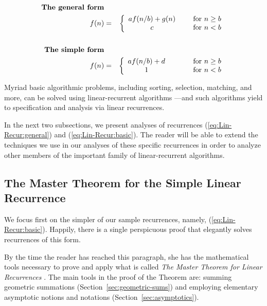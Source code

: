 \newpage

\begin{eqnarray}
\nonumber
\mbox{\bf The general form} & & \\
\label{eq:Lin-Recur:general}
f(n) & = & \left\{
\begin{array}{cl}
a f(n/b) + g(n) & \hspace*{.2in} \mbox{for } n \geq b \\
c & \hspace*{.2in} \mbox{for } n < b
\end{array}
\right. \\
\nonumber
  & & \\
\nonumber
\mbox{\bf The simple form} & & \\
\label{eq:Lin-Recur:basic}
f(n) & = & \left\{
\begin{array}{cl}
a f(n/b) + d & \hspace*{.4in} \mbox{for } n \geq b \\
1 & \hspace*{.4in} \mbox{for } n < b
\end{array}
\right.
\end{eqnarray}


Myriad basic algorithmic problems, including sorting, selection,
matching, and more, can be solved using linear-recurrent
algorithms \cite{CLRS}---and such algorithms yield to specification
and analysis via linear recurrences.

In the next two subsections, we present analyses of recurrences
(\ref{eq:Lin-Recur:general}) and (\ref{eq:Lin-Recur:basic}).  The
reader will be able to extend the techniques we use in our analyses of
these specific recurrences in order to analyze other members of the
important family of linear-recurrent algorithms.


\subsection{The Master Theorem for the Simple Linear Recurrence} 
\label{sec:masterTheorem}
\label{sec:linear-recurrence-basic}

We focus first on the simpler of our sample recurrences, namely,
(\ref{eq:Lin-Recur:basic}).  Happily, there is a single perspicuous
proof that elegantly solves recurrences of this form.

By the time the reader has reached this paragraph, she has the
mathematical tools necessary to prove and apply what is called {\it
  The Master Theorem for Linear Recurrences} \cite{CLRS}.  The main
tools in the proof of the Theorem are: summing geometric summations
(Section~\ref{sec:geometric-sums}) and employing elementary asymptotic
notions and notations (Section~\ref{sec:asymptotics}).


